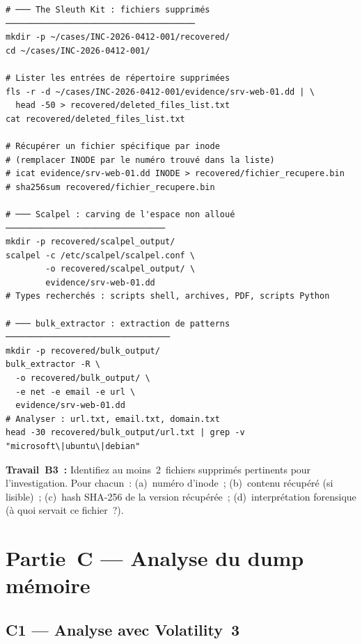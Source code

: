 \begin{lstlisting}[style=StyleTerminal,
  caption={Carving et récupération de fichiers supprimés},
  label={lst:lab2-carving}]
# ─── The Sleuth Kit : fichiers supprimés ──────────────────────────────────────
mkdir -p ~/cases/INC-2026-0412-001/recovered/
cd ~/cases/INC-2026-0412-001/

# Lister les entrées de répertoire supprimées
fls -r -d ~/cases/INC-2026-0412-001/evidence/srv-web-01.dd | \
  head -50 > recovered/deleted_files_list.txt
cat recovered/deleted_files_list.txt

# Récupérer un fichier spécifique par inode
# (remplacer INODE par le numéro trouvé dans la liste)
# icat evidence/srv-web-01.dd INODE > recovered/fichier_recupere.bin
# sha256sum recovered/fichier_recupere.bin

# ─── Scalpel : carving de l'espace non alloué ────────────────────────────────
mkdir -p recovered/scalpel_output/
scalpel -c /etc/scalpel/scalpel.conf \
        -o recovered/scalpel_output/ \
        evidence/srv-web-01.dd
# Types recherchés : scripts shell, archives, PDF, scripts Python

# ─── bulk_extractor : extraction de patterns ─────────────────────────────────
mkdir -p recovered/bulk_output/
bulk_extractor -R \
  -o recovered/bulk_output/ \
  -e net -e email -e url \
  evidence/srv-web-01.dd
# Analyser : url.txt, email.txt, domain.txt
head -30 recovered/bulk_output/url.txt | grep -v "microsoft\|ubuntu\|debian"
\end{lstlisting}

\begin{boxexo}
\textbf{Travail~B3~:} Identifiez au moins~2~fichiers supprimés
pertinents pour l'investigation. Pour chacun~:
(a)~numéro d'inode~;
(b)~contenu récupéré (si lisible)~;
(c)~hash SHA-256 de la version récupérée~;
(d)~interprétation forensique (à quoi servait ce fichier~?).
\end{boxexo}


\section{Partie~C — Analyse du dump mémoire}
\label{lab2:partieC}

\subsection{C1 — Analyse avec Volatility~3}


